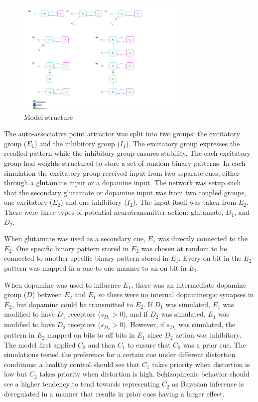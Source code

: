 \documentclass[twocolumn]{article}
\begin{document}
\begin{figure}
    \centering
    \includegraphics[width=0.75\textwidth]{model_arch.png}
    \caption{Model structure}
\end{figure}

The auto-associative point attractor was split into two groups: the excitatory group ($E_1$) and the inhibitory group ($I_1$). 
The excitatory group expresses the recalled pattern while the inhibitory group ensures stability. 
The each excitatory group had weights structured to store a set of random binary patterns.
In each simulation the excitatory group received input from two separate cues, either through a glutamate input or a dopamine input. 
The network was setup such that the secondary glutamate or dopamine input was from two coupled groups, one excitatory ($E_2$) and one inhibitory ($I_2$).
The input itself was taken from $E_2$. 
There were three types of potential neurotransmitter action: glutamate, $D_1$, and $D_2$. 

When glutamate was used as a secondary cue, $E_1$ was directly connected to the $E_2$. 
One specific binary pattern stored in $E_2$ was chosen at random to be connected to another specific binary pattern stored in $E_1$. Every on bit in the $E_2$ pattern was mapped in a one-to-one manner to an on bit in $E_1$.

When dopamine was used to influence $E_1$, there was an intermediate dopamine group ($D$) between $E_2$ and $E_1$ so there were no internal dopaminergic synapses in $E_2$, but dopamine could be transmitted to $E_2$.
If $D_1$ was simulated, $E_1$ was modified to have $D_1$ receptors ($s_{D_1} > 0$), and if $D_2$ was simulated, $E_1$ was modified to have $D_2$ receptors ($s_{D_2} > 0$).
However, if $s_{D_2}$ was simulated, the pattern in $E_2$ mapped on bits to off bits in $E_1$ since $D_2$ action was inhibitory.
The model first applied $C_2$ and then $C_1$ to ensure that $C_2$ was a prior cue. 
The simulations tested the preference for a certain cue under different distortion conditions; a healthy control should see that $C_1$ takes priority when distortion is low but $C_2$ takes priority when distortion is high.
Schizophrenic behavior should see a higher tendency to tend towards representing $C_2$ as Bayesian inference is deregulated in a manner that results in prior cues having a larger effect.
\end{document}
